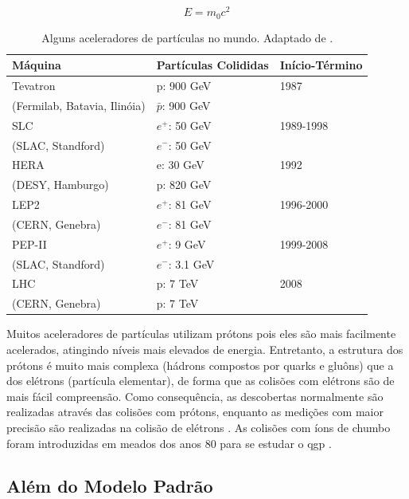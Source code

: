 \begin{equation} \label{eq:einstein}
E=m_0c^2
\end{equation}

\begin{table}
\centering
\begin{tabular}{lll}
\hline \hline \hline
\textbf{Máquina} & \textbf{Partículas Colididas} & \textbf{Início-Término} \\
\hline \hline
Tevatron & p: 900 GeV & 1987 \\
(Fermilab, Batavia, Ilinóia) & $\bar{p}$: 900 GeV & \\
\hline
SLC & $e^{+}$: 50 GeV & 1989-1998 \\
(SLAC, Standford) & $e^{-}$: 50 GeV & \\
\hline
HERA & e: 30 GeV & 1992 \\
(DESY, Hamburgo) & p: 820 GeV & \\
\hline
LEP2 & $e^{+}$: 81 GeV & 1996-2000 \\
(CERN, Genebra) & $e^{-}$: 81 GeV & \\
\hline
PEP-II & $e^{+}$: 9 GeV & 1999-2008 \\
(SLAC, Standford) & $e^{-}$: 3.1 GeV & \\
\hline
LHC & p: 7 TeV & 2008 \\
(CERN, Genebra) & p: 7 TeV & \\
\hline \hline
\end{tabular}
\caption{Alguns aceleradores de partículas no mundo. Adaptado de \cite{Intro_Standard}.}
\label{tab:aceleradores}
\end{table}


Muitos aceleradores de partículas utilizam prótons pois eles são mais facilmente
acelerados, atingindo níveis mais elevados de energia. Entretanto, a
estrutura dos prótons é muito mais complexa (hádrons
compostos por quarks e gluôns) que a dos elétrons (partícula elementar), de forma que as colisões com elétrons são 
de mais fácil compreensão. Como consequência, as
descobertas normalmente são realizadas através das colisões com prótons, enquanto as medições com
maior precisão são realizadas na colisão de elétrons \cite{nature_space_and_time}.
As colisões com íons de chumbo foram introduzidas em meados dos anos 80
para se estudar o \gls{qgp} \cite{heavy_ions}.

\subsection{Além do Modelo Padrão}
\label{ssec:alem_do_mp}

